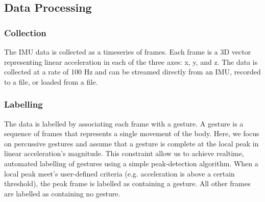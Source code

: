 \documentclass{nime-alternate} %
\begin{document}
\subsection{Data Processing}
\subsubsection{Collection}
The IMU data is collected as a timeseries of frames. Each frame is a 3D vector representing linear acceleration in each of the three axes: x, y, and z. The data is collected at a rate of 100 Hz and can be streamed directly from an IMU, recorded to a file, or loaded from a file.

\subsubsection{Labelling}
The data is labelled by associating each frame with a gesture. A gesture is a sequence of frames that represents a single movement of the body. Here, we focus on percussive gestures and assume that a gesture is complete at the local peak in linear acceleration's magnitude. This constraint allow us to achieve realtime, automated labelling of gestures using a simple peak-detection algorithm. When a local peak meet's user-defined criteria (e.g. acceleration is above a certain threshold), the peak frame is labelled as containing a gesture. All other frames are labelled as containing no gesture.
\end{document}
